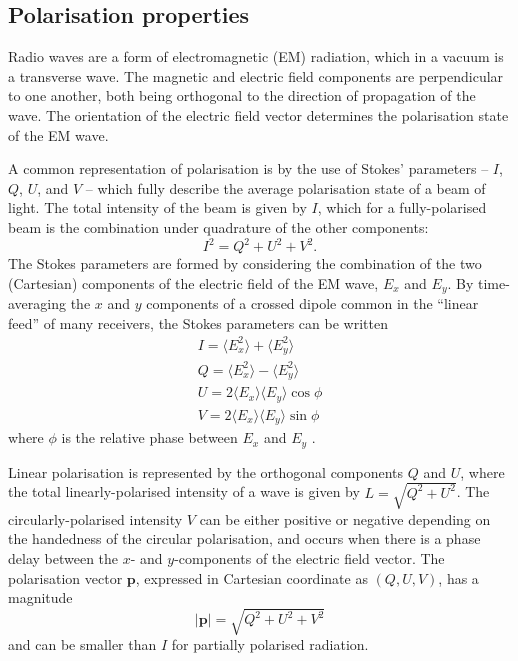 \subsection{Polarisation properties}
\label{sec: intro - emission models - polarisation}

Radio waves are a form of electromagnetic (EM) radiation, which in a vacuum is a transverse wave. The magnetic and electric field components are perpendicular to one another, both being orthogonal to the direction of propagation of the wave. The orientation of the electric field vector determines the polarisation state of the EM wave.

A common representation of polarisation is by the use of Stokes' parameters -- $I$, $Q$, $U$, and $V$ -- which fully describe the average polarisation state of a beam of light. The total intensity of the beam is given by $I$, which for a fully-polarised beam is the combination under quadrature of the other components:
\begin{equation}
    \label{eq: stokes parameters quadrature}
    I^2 = Q^2 + U^2 + V^2.   
\end{equation}
The Stokes parameters are formed by considering the combination of the two (Cartesian) components of the electric field of the EM wave, $E_x$ and $E_y$. By time-averaging the $x$ and $y$ components of a crossed dipole common in the ``linear feed'' of many receivers, the Stokes parameters can be written
\begin{align}
    I = \langle E_x^2 \rangle + \langle E_y^2 \rangle \label{eq: intro - stokes I linear}\\
    Q = \langle E_x^2 \rangle - \langle E_y^2 \rangle \label{eq: intro - stokes Q linear}\\
    U = 2\langle E_x\rangle \langle E_y\rangle \cos\phi \label{eq: intro - stokes U linear}\\
    V = 2\langle E_x\rangle \langle E_y \rangle \sin\phi \label{eq: intro - stokes V linear}
\end{align}  
where $\phi$ is the relative phase between $E_x$ and $E_y$ \citep{Handbook}.

Linear polarisation is represented by the orthogonal components $Q$ and $U$, where the total linearly-polarised intensity of a wave is given by $L = \sqrt{Q^2 + U^2}$. The circularly-polarised intensity $V$ can be either positive or negative depending on the handedness of the circular polarisation, and occurs when there is a phase delay between the $x$- and $y$-components of the electric field vector. The polarisation vector $\mathbf{p}$, expressed in Cartesian coordinate as $(Q,U,V)$, has a magnitude
\begin{equation}
    \label{eq: polarisation vector magnitude}
    |\mathbf{p}| = \sqrt{Q^2 + U^2 + V^2}
\end{equation}
and can be smaller than $I$ for partially polarised radiation.

